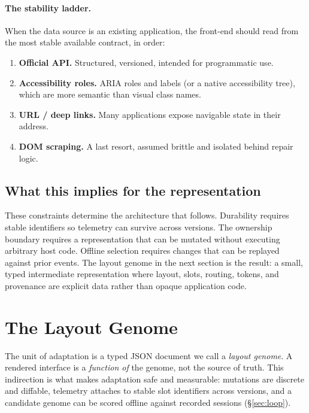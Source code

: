 \documentclass[11pt]{article}
\begin{document}
\paragraph{The stability ladder.}
When the data source is an existing application, the front-end should read from
the most stable available contract, in order:
\begin{enumerate}[leftmargin=1.6em,itemsep=1pt]
  \item \textbf{Official API.} Structured, versioned, intended for programmatic
  use.
  \item \textbf{Accessibility roles.} ARIA roles and labels (or a native
  accessibility tree), which are more semantic than visual class names.
  \item \textbf{URL / deep links.} Many applications expose navigable state in
  their address.
  \item \textbf{DOM scraping.} A last resort, assumed brittle and isolated behind
  repair logic.
\end{enumerate}

\subsection{What this implies for the representation}

These constraints determine the architecture that follows. Durability requires
stable identifiers so telemetry can survive across versions. The ownership
boundary requires a representation that can be mutated without executing
arbitrary host code. Offline selection requires changes that can be replayed
against prior events. The layout genome in the next section is the result: a
small, typed intermediate representation where layout, slots, routing, tokens,
and provenance are explicit data rather than opaque application code.

\section{The Layout Genome}
\label{sec:genome}

The unit of adaptation is a typed JSON document we call a \emph{layout genome}. A
rendered interface is a \emph{function of} the genome, not the source of truth.
This indirection is what makes adaptation safe and measurable: mutations are
discrete and diffable, telemetry attaches to stable slot identifiers across
versions, and a candidate genome can be scored offline against recorded sessions
(\S\ref{sec:loop}).
\end{document}
